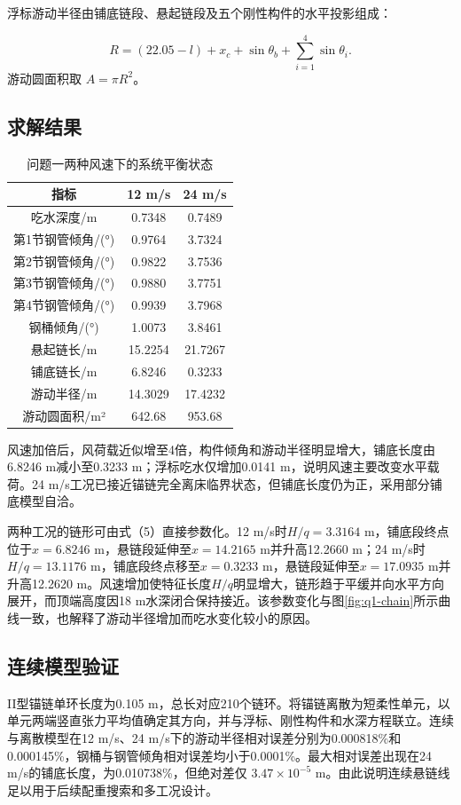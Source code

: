 浮标游动半径由铺底链段、悬起链段及五个刚性构件的水平投影组成：

\[
R=(22.05-l)+x_c+\sin\theta_b+
\sum_{i=1}^{4}\sin\theta_i. \tag{7}
\]
游动圆面积取 \(A=\pi R^2\)。

\subsection{求解结果}
\begin{table}[H]\centering\small
\caption{问题一两种风速下的系统平衡状态}
\label{tab:q1-1}
\begin{tabular}{ccc}
\toprule
指标 & 12 m/s & 24 m/s \\
\midrule
吃水深度/m & 0.7348 & 0.7489 \\
第1节钢管倾角/(°) & 0.9764 & 3.7324 \\
第2节钢管倾角/(°) & 0.9822 & 3.7536 \\
第3节钢管倾角/(°) & 0.9880 & 3.7751 \\
第4节钢管倾角/(°) & 0.9939 & 3.7968 \\
钢桶倾角/(°) & 1.0073 & 3.8461 \\
悬起链长/m & 15.2254 & 21.7267 \\
铺底链长/m & 6.8246 & 0.3233 \\
游动半径/m & 14.3029 & 17.4232 \\
游动圆面积/m² & 642.68 & 953.68 \\
\bottomrule
\end{tabular}
\end{table}
风速加倍后，风荷载近似增至4倍，构件倾角和游动半径明显增大，铺底长度由6.8246 m减小至0.3233 m；浮标吃水仅增加0.0141 m，说明风速主要改变水平载荷。24 m/s工况已接近锚链完全离床临界状态，但铺底长度仍为正，采用部分铺底模型自洽。

两种工况的链形可由式（5）直接参数化。12 m/s时$H/q=3.3164$ m，铺底段终点位于$x=6.8246$ m，悬链段延伸至$x=14.2165$ m并升高12.2660 m；24 m/s时$H/q=13.1176$ m，铺底段终点移至$x=0.3233$ m，悬链段延伸至$x=17.0935$ m并升高12.2620 m。风速增加使特征长度$H/q$明显增大，链形趋于平缓并向水平方向展开，而顶端高度因18 m水深闭合保持接近。该参数变化与图\ref{fig:q1-chain}所示曲线一致，也解释了游动半径增加而吃水变化较小的原因。

\subsection{连续模型验证}
II型锚链单环长度为0.105 m，总长对应210个链环。将锚链离散为短柔性单元，以单元两端竖直张力平均值确定其方向，并与浮标、刚性构件和水深方程联立。连续与离散模型在12 m/s、24 m/s下的游动半径相对误差分别为0.000818\%和0.000145\%，钢桶与钢管倾角相对误差均小于0.0001\%。最大相对误差出现在24 m/s的铺底长度，为0.010738\%，但绝对差仅 \(3.47\times10^{-5}\) m。由此说明连续悬链线足以用于后续配重搜索和多工况设计。

